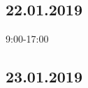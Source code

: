 \documentclass{article}
\begin{document}
\subsection*{22.01.2019}
9:00-17:00

\subsection*{23.01.2019}
\end{document}

